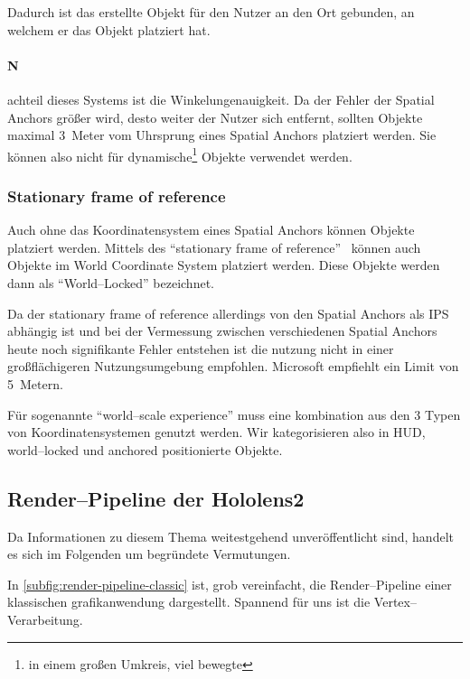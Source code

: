         Dadurch ist das erstellte Objekt für den Nutzer an den Ort gebunden, an welchem er das Objekt platziert hat.

        \paragraph{N}achteil dieses Systems ist die Winkelungenauigkeit.
            Da der Fehler der Spatial Anchors größer wird, desto weiter der Nutzer sich entfernt, sollten Objekte maximal 3~Meter vom Uhrsprung eines Spatial Anchors platziert werden.
            Sie können also nicht für dynamische\footnote{in einem großen Umkreis, viel bewegte} Objekte verwendet werden.

    \subsubsection{Stationary frame of reference}\label{subsubsec:stationary-frame-of-reference}
        Auch ohne das Koordinatensystem eines Spatial Anchors können Objekte platziert werden.
        Mittels des \enquote{stationary frame of reference}~\autocite{thetuvix-2023A} können auch Objekte im World Coordinate System platziert werden.
        Diese Objekte werden dann als \enquote{World--Locked} bezeichnet.

        Da der stationary frame of reference allerdings von den Spatial Anchors als IPS abhängig ist und bei der Vermessung zwischen verschiedenen Spatial Anchors heute noch signifikante Fehler entstehen ist die nutzung nicht in einer großflächigeren Nutzungsumgebung empfohlen.
        Microsoft empfiehlt ein Limit von 5~Metern.

        Für sogenannte \enquote{world--scale experience} muss eine kombination aus den 3 Typen von Koordinatensystemen genutzt werden.
        Wir kategorisieren also in HUD, world--locked und anchored positionierte Objekte.

\subsection{Render--Pipeline der Hololens2}\label{subsec:renderpipeline-der-hololens2}
    Da Informationen zu diesem Thema weitestgehend unveröffentlicht sind, handelt es sich im Folgenden um begründete Vermutungen.

    In \autoref{subfig:render-pipeline-classic} ist, grob vereinfacht, die Render--Pipeline einer klassischen grafikanwendung dargestellt.
    Spannend für uns ist die Vertex--Verarbeitung.

